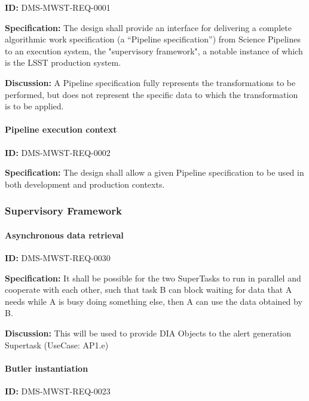 \documentclass[SE,toc,lsstdraft]{lsstdoc}
\begin{document}
\label{DMS-MWST-REQ-0001}
\textbf{ID:} DMS-MWST-REQ-0001

\textbf{Specification:}
The design shall provide an interface for delivering a complete algorithmic work specification (a “Pipeline specification”) from Science Pipelines to an execution system, the "supervisory framework", a notable instance of which is the LSST production system.

\textbf{Discussion:}
A Pipeline specification fully represents the transformations to be performed, but does not represent the specific data to which the transformation is to be applied.

\paragraph{Pipeline execution context}\hfill  %

\label{DMS-MWST-REQ-0002}
\textbf{ID:} DMS-MWST-REQ-0002

\textbf{Specification:}
The design shall allow a given Pipeline specification to be used in both development and production contexts.

\subsubsection{Supervisory Framework}

\paragraph{Asynchronous data retrieval}\hfill  %

\label{DMS-MWST-REQ-0030}
\textbf{ID:} DMS-MWST-REQ-0030

\textbf{Specification:}
It shall be possible for the two SuperTasks to run in parallel and cooperate with each other, such that task B can block waiting for data that A needs while A is busy doing something else, then A can use the data obtained by B.

\textbf{Discussion:}
This will be used to provide DIA Objects to the alert generation Supertask (UseCase: AP1.e)

\paragraph{Butler instantiation}\hfill  %

\label{DMS-MWST-REQ-0023}
\textbf{ID:} DMS-MWST-REQ-0023
\end{document}
